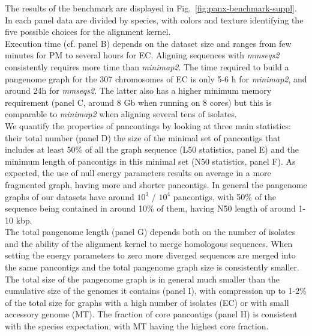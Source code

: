 \documentclass[aps,rmp,reprint,superscriptaddress,notitlepage,10pt,onecolumn]{revtex4-1}
\begin{document}
The results of the benchmark are displayed in Fig.~\ref{fig:panx-benchmark-suppl}. In each panel data are divided by species, with colors and texture identifying the five possible choices for the alignment kernel.\\
Execution time (cf. panel B) depends on the dataset size and ranges from few minutes for PM to several hours for EC. Aligning sequences with \textit{mmseqs2} consistently requires more time than \textit{minimap2}. The time required to build a pangenome graph for the 307 chromosomes of EC is only 5-6 h for \textit{minimap2}, and around 24h for \textit{mmseqs2}. The latter also has a higher minimum memory requirement (panel C, around 8 Gb when running on 8 cores) but this is comparable to \textit{minimap2} when aligning several tens of isolates.\\
We quantify the properties of pancontings by looking at three main statistics: their total number (panel D) the size of the minimal set of pancontigs that includes at least 50\% of all the graph sequence (L50 statistics, panel E) and the minimum length of pancontigs in this minimal set (N50 statistics, panel F). As expected, the use of null energy parameters results on average in a more fragmented graph, having more and shorter pancontigs. In general the pangenome graphs of our datasets have around $10^3$ / $10^4$ pancontigs, with 50\% of the sequence being contained in around 10\% of them, having N50 length of around 1-10 kbp.\\
The total pangenome length (panel G) depends both on the number of isolates and the ability of the alignment kernel to merge homologous sequences. When setting the energy parameters to zero more diverged sequences are merged into the same pancontigs and the total pangenome graph size is consistently smaller. The total size of the pangenome graph is in general much smaller than the cumulative size of the genomes it contains (panel I), with compression up to 1-2\% of the total size for graphs with a high number of isolates (EC) or with small accessory genome (MT). The fraction of core pancontigs (panel H) is consistent with the species expectation, with MT having the highest core fraction.\\
\end{document}

